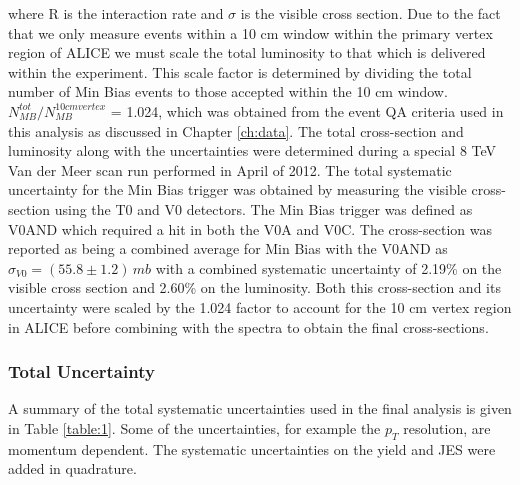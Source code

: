 \noindent
where R is the interaction rate and $\sigma$ is the visible cross section.  Due to the fact that we only measure events within a 10 cm window within the primary vertex region of ALICE we must scale the total luminosity to that which is delivered within the experiment.  This scale factor is determined by dividing the total number of Min Bias events to those accepted within the 10 cm window.  $N^{tot}_{MB} / N^{10 cm vertex}_{MB}$ = 1.024, which was obtained from the event QA criteria used in this analysis as discussed in Chapter \ref{ch:data}.
The total cross-section and luminosity along with the uncertainties were determined during a special 8 TeV Van der Meer scan run performed in April of 2012\cite{ALICE-PUBLIC-2017-002}.  The total systematic uncertainty for the Min Bias trigger was obtained by measuring the visible cross-section using the T0 and V0 detectors.  The Min Bias trigger was defined as V0AND which required a hit in both the V0A and V0C.  The cross-section was reported as being a combined average for Min Bias with the V0AND as $\sigma_{V0} = (55.8 \pm 1.2) \, mb$ with a combined systematic uncertainty of 2.19\% on the visible cross section and 2.60\% on the luminosity.  Both this cross-section and its uncertainty were scaled by the 1.024 factor to account for the 10 cm vertex region in ALICE before combining with the spectra to obtain the final cross-sections.


\subsubsection{Total Uncertainty}

A summary of the total systematic uncertainties used in the final analysis is given in Table \ref{table:1}.  Some of the uncertainties, for example the $p_{T}$ resolution, are momentum dependent.  The systematic uncertainties on the yield and JES were added in quadrature.
\newline

